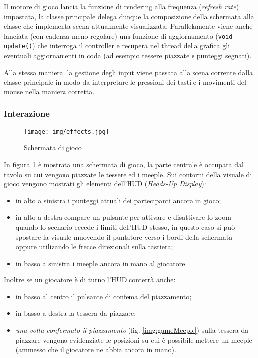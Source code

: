 Il motore di gioco lancia la funzione di rendering alla frequenza (\emph{refresh rate}) impostata, la classe principale
delega dunque la composizione della schermata alla classe che implementa scena attualmente visualizzata.
Parallelamente viene anche lanciata (con cadenza meno regolare) una funzione di aggiornamento (\texttt{void update()}) che interroga il controller e recupera nel thread della grafica gli eventuali aggiornamenti in coda (ad esempio tessere piazzate e punteggi segnati).

Alla stessa maniera, la gestione degli input viene passata alla scena corrente dalla classe principale in modo da interpretare le pressioni dei tasti e i movimenti del mouse nella maniera corretta.

\subsubsection{Interazione}
\begin{figure}[htbp]
	\texttt{[image: img/effects.jpg]}
	\caption{Schermata di gioco}
	\label{img:game}
\end{figure}

In figura \ref{img:game} \`e mostrata una schermata di gioco, la parte centrale \`e occupata dal tavolo su cui vengono piazzate le tessere ed i meeple. 
Sui contorni della visuale di gioco vengono mostrati gli elementi dell'HUD (\emph{Heads-Up Display}): 
\begin{itemize}
\item in alto a sinistra i punteggi attuali dei partecipanti ancora in gioco;
\item in alto a destra compare un pulsante per attivare e disattivare lo zoom quando lo scenario eccede i limiti dell'HUD stesso, in questo caso si pu\`o spostare la visuale muovendo il puntatore verso i bordi della schermata oppure utilizando le frecce direzionali sulla tastiera;
\item in basso a sinistra i meeple ancora in mano al giocatore.
\end{itemize}
Inoltre se un giocatore \`e di turno l'HUD conterr\`a anche:
\begin{itemize}
\item in basso al centro il pulsante di confema del piazzamento;
\item in basso a destra la tessera da piazzare;
\item \emph{una volta confermato il piazzamento} (fig. \ref{img:gameMeeple}) sulla tessera da piazzare vengono evidenziate le posizioni su cui \`e possibile mettere un meeple (ammesso che il giocatore ne abbia ancora in mano).
\end{itemize}

